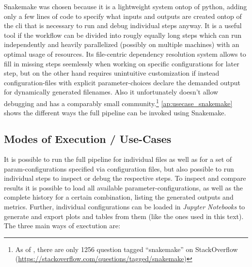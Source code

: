 Snakemake was chosen because it is a lightweight system ontop of python, adding only a few lines of code to specify what inputs and outputs are created ontop of the \gls{cli} that is necessary to run and debug individual steps anyway. It is a useful tool if the workflow can be divided into rougly equally long steps which can run independently and heavily parallelized (possibly on multiple machines) with an optimal usage of resources. Its file-centric dependency resolution system allows to fill in missing steps seemlessly when working on specific configurations for later step, but on the other hand requires unintuitive customization if instead configuration-files with explicit parameter-choices declare the demanded output for dynamically generated filenames. Also it unfortunately doesn't allow debugging and has a comparably small community.\footnote{As of , there are only 1256 question tagged ``snakemake'' on StackOverflow (\url{https://stackoverflow.com/questions/tagged/snakemake})} \autoref{ap:usecase_snakemake} shows the different ways the full pipeline can be invoked using Snakemake.



\subsection{Modes of Execution / Use-Cases}

It is possible to run the full pipeline for individual files as well as for a set of \gls{param}-configurations specified via configuration files, but also possible to run individual steps to inspect or debug the respective steps. To inspect and compare results it is possible to load all available parameter-configurations, as well as the complete history for a certain combination, listing the generated outputs and metrics. Further, individual configurations can be loaded in \emph{Jupyter Notebooks} to generate and export plots and tables from them (like the ones used in this text). The three main ways of exectution are:

